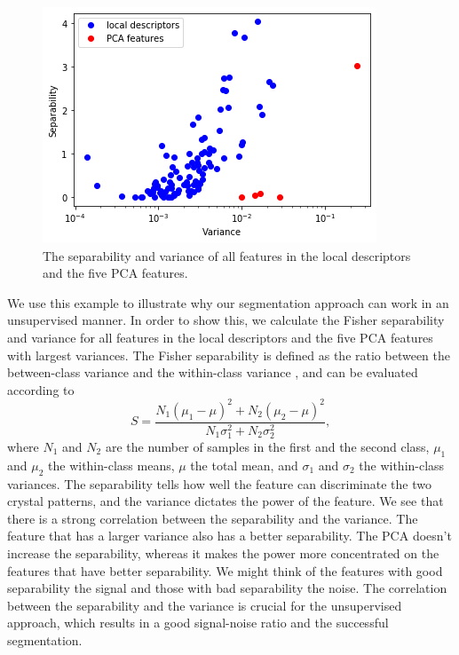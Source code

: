 \documentclass[twocolumn,amsmath, floatfix]{revtex4}
\begin{document}
\begin{figure}
    \centering
    \includegraphics[width=0.8\columnwidth]{separability_and_variance.png}
    \caption{ The separability and variance of all features in the local descriptors and the five PCA features.  }
    \label{fig:separability_and_variance}
\end{figure}
We use this example to illustrate why our segmentation approach can work in an unsupervised manner. In order to show this, we calculate the Fisher separability \cite{Fisher1936} and variance for all features in the local descriptors and the five PCA features with largest variances. The Fisher separability is defined as the ratio between the between-class variance and the within-class variance \cite{Fisher1936}, and can be evaluated according to
\begin{equation}
    S = \frac{N_1(\mu_1-\mu)^2 + N_2(\mu_2-\mu)^2}{
    N_1\sigma_1^2 + N_2 \sigma_2^2},
\end{equation}
where $N_1$ and $N_2$ are the number of samples in the first and the second class, $\mu_1$ and $\mu_2$ the within-class means, $\mu$ the total mean, and $\sigma_1$ and $\sigma_2$ the within-class variances. The separability tells how well the feature can discriminate the two crystal patterns, and the variance dictates the power of the feature. We see that there is a strong correlation between the separability and the variance. The feature that has a larger variance also has a better separability. 
The PCA doesn't increase the separability, whereas it makes the power more concentrated on the features that have better separability. We might think of the features with good separability the signal and those with bad separability the noise. The correlation between the separability and the variance is crucial for the unsupervised approach, which results in a good signal-noise ratio and the successful segmentation.   
\end{document}
